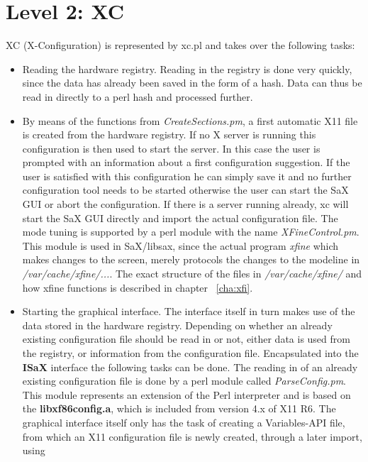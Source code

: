 \section{Level 2: XC}
\label{sec:le2}
XC (X-Configuration) is represented by xc.pl and 
takes over the following tasks:
\begin{itemize}
\item Reading the hardware registry. Reading in the registry is done very
      quickly, since the data has already been saved in the form of a hash. Data
      can thus be read in directly to a perl hash and processed further. 
\item By means of the functions from \textit{CreateSections.pm}, 
      a first automatic X11 file is created from the hardware registry. If 
      no X server is running this configuration is then used to start the
      server. In this case the user is prompted with an information about
      a first configuration suggestion. If the user is satisfied with
      this configuration he can simply save it and no further configuration
      tool needs to be started otherwise the user can start the SaX GUI or
      abort the configuration. If there is a server running already,
      xc will start the SaX GUI directly and import the actual configuration
	  file. The mode tuning is supported by a perl module with the name
      \textit{XFineControl.pm}. This module is used in SaX/libsax, since the
      actual program \textit{xfine} which makes changes to the screen,
      merely protocols the changes to the modeline in
	  \textit{/var/cache/xfine/...}. The exact structure of the files
      in \textit{/var/cache/xfine/} and how xfine functions is described
      in chapter ~\ref{cha:xfi}.
\item Starting the graphical interface. The interface itself in turn makes use
      of the data stored in the hardware registry.
      Depending on whether an already existing configuration file should be
      read in or not, either data is used from the registry, or information
      from the configuration file. Encapsulated into the \textbf{ISaX}
      interface the following tasks can be done. The reading in of an already
      existing configuration file is done by a perl module called
      \textit{ParseConfig.pm}. This module represents an extension of the 
      Perl interpreter and is based on the \textbf{libxf86config.a}, which is
      included from version 4.x of X11 R6. The graphical interface itself
      only has the task of creating a Variables-API file, from which an
      X11 configuration file is newly created, through a later import, using

\end{itemize}
